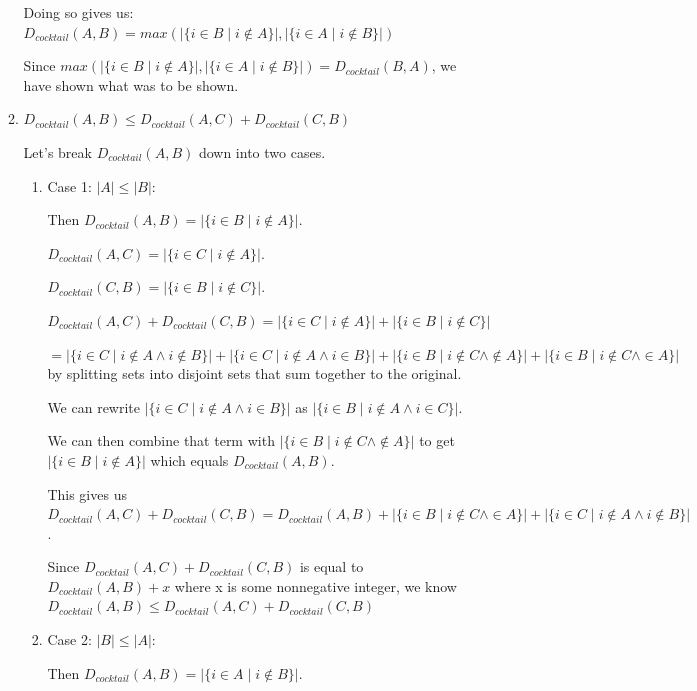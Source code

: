 \documentclass{article}
\begin{document}
\begin{enumerate}
\begin{enumerate}
       Doing so gives us:  $D_{cocktail}(A, B) = max(|\{ i \in B \mid i \notin A\}|, |\{ i \in A \mid i \notin B\}|)$ 
       
       Since $max(|\{ i \in B \mid i \notin A\}|, |\{ i \in A \mid i \notin B\}|) = D_{cocktail}(B, A)$, we have shown what was to be shown.
       
       \item $D_{cocktail}(A, B) \leq D_{cocktail}(A, C) + D_{cocktail}(C, B)$
       
       Let's break  $D_{cocktail}(A, B)$ down into two cases.
       \begin{enumerate}
       \item Case 1: $|A| \leq |B|$:
       
       Then $D_{cocktail}(A, B) = |\{ i \in B \mid i \notin A\}|$.
       
       $D_{cocktail}(A, C) = |\{ i \in C \mid i \notin A\}|$.
       
       $D_{cocktail}(C, B) = |\{ i \in B \mid i \notin C\}|$.
       
	$D_{cocktail}(A, C) + D_{cocktail}(C, B) = |\{ i \in C \mid i \notin A\}| + |\{ i \in B \mid i \notin C\}|$
	
	$= |\{ i \in C \mid i \notin A \land i \notin B\}| +  |\{ i \in C \mid i \notin A \land i \in B\}| + |\{ i \in B \mid i \notin C \land  \notin A\}| + |\{ i \in B \mid i \notin C \land  \in A\}|$ 
	\qquad by splitting sets into disjoint sets that sum together to the original.
       
       We can rewrite $|\{ i \in C \mid i \notin A \land i \in B\}|$ as $|\{ i \in B \mid i \notin A \land i \in C\}|$.
       
       We can then combine that term with $ |\{ i \in B \mid i \notin C \land  \notin A\}|$ to get $ |\{ i \in B \mid i \notin A\}|$ which equals $D_{cocktail}(A, B)$.
       
       This gives us $D_{cocktail}(A, C) + D_{cocktail}(C, B) = D_{cocktail}(A, B) + |\{ i \in B \mid i \notin C \land  \in A\}| + |\{ i \in C \mid i \notin A \land i \notin B\}|$.
       
       Since $D_{cocktail}(A, C) + D_{cocktail}(C, B)$ is equal to $D_{cocktail}(A, B) + x$ where x is some nonnegative integer, we know  $D_{cocktail}(A, B) \leq D_{cocktail}(A, C) + D_{cocktail}(C, B)$
       
        \item Case 2: $|B| \leq |A|$:
       
       Then $D_{cocktail}(A, B) = |\{ i \in A \mid i \notin B\}|$.
       

\end{enumerate}
\end{enumerate}
\end{enumerate}
\end{document}
